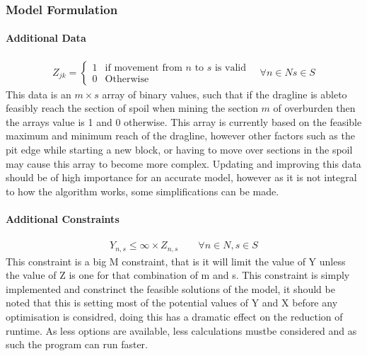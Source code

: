 \subsubsection{Model Formulation}
\paragraph*{Additional Data}

\begin{align}
\label{MIP:Data Valid}
Z_{jk}  = \begin{cases} 1& \text{if movement from $n$ to $s$ is valid}\\
0& \text{Otherwise}   \end{cases} 
\quad \forall n \in N s\in S
\end{align}
This data is an $m\times s$ array of binary values, such that if the dragline is ableto feasibly reach the section of spoil when mining the section $m$ of overburden then the arrays value is 1 and 0 otherwise. This array is currently based on the feasible  maximum and minimum reach of the dragline, however other factors such as the pit edge while starting a new block, or having to move over sections in the spoil may cause this array to become more complex. Updating and improving this data should be of high importance for an accurate model, however as it is not integral to how the algorithm works, some simplifications can be made.
\paragraph*{Additional Constraints}
\begin{align}
\label{MIP:Valid}
Y_{n,s}\leq \infty\times Z_{n,s} \qquad \forall n \in N , s\in S
\end{align}
This constraint is a big M constraint, that is it will limit the value of Y unless the value of Z is one for that combination of m and s. This constraint is simply implemented and constrinct the feasible solutions of the model, it should be noted that this is setting most of the potential values of Y and X before any optimisation is considred, doing this has a dramatic effect on the reduction of runtime. As less options are available, less calculations mustbe considered and as such the program can run faster.
